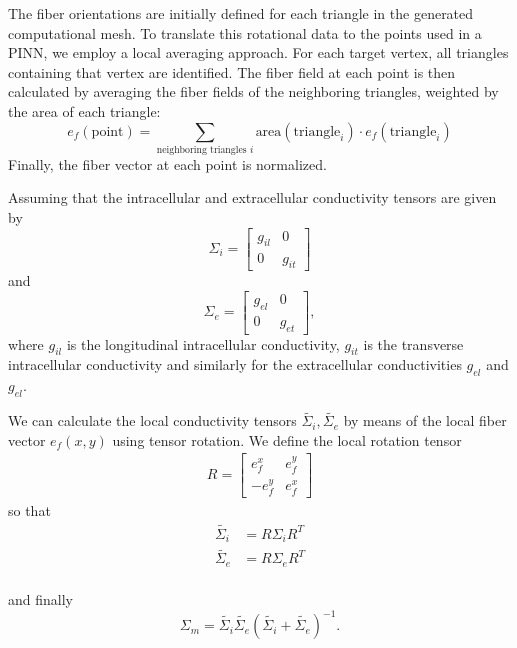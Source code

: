 The fiber orientations are initially defined for each triangle in the generated computational mesh. To translate this rotational data to the points used in a PINN, we employ a local averaging approach. For each target vertex, all triangles containing that vertex are identified. The fiber field at each point is then calculated by averaging the fiber fields of the neighboring triangles, weighted by the area of each triangle:
\[
e_f (\text{point}) = \sum_{\text{neighboring triangles } i} \text{area}(\text{triangle}_i) \cdot e_f(\text{triangle}_i)
\]
Finally, the fiber vector at each point is normalized.


Assuming that the intracellular and extracellular conductivity tensors are given by
\begin{equation}
\Sigma_i = \begin{bmatrix} g_{il} & 0 \\ 0 & g_{it} \end{bmatrix}
\end{equation}
and
\begin{equation}
\Sigma_e = \begin{bmatrix} g_{el} & 0 \\ 0 & g_{et} \end{bmatrix},
\end{equation}
where $g_{il}$ is the longitudinal intracellular conductivity,  $g_{it}$ is the transverse intracellular conductivity and similarly for the extracellular conductivities $g_{el}$ and $g_{el}$.

We can calculate the local conductivity tensors $\tilde{\Sigma_i}, \tilde{\Sigma_e}$
by means of the local fiber vector $e_f(x,y)$ using tensor rotation. We define the local rotation tensor 
\begin{align} 
R = \begin{bmatrix} e_f^x & e_f^y \\  -e_f^y & e_f^x \end{bmatrix}
\end{align}
so that
\begin{align}
\tilde{\Sigma_i} &= R \Sigma_i R^T\\
\tilde{\Sigma_e} &= R \Sigma_e R^T \\
\end{align}

and finally
\begin{equation}
\Sigma_m = \tilde{\Sigma_i} \tilde{\Sigma_e} (\tilde{\Sigma_i} + \tilde{\Sigma_e})^{-1}.
\end{equation}


